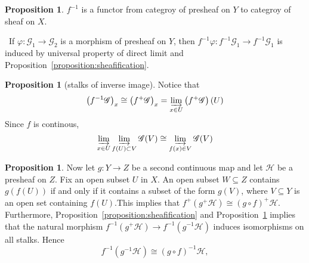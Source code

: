 \documentclass[12pt,a4paper]{book}
\newenvironment{prooff}{{\noindent\it\textcolor{cyan!40!black}{Proof}:}\,}{\par}
\theoremstyle{definition}
\newtheorem{prop}[defn]{Proposition}
\begin{document}
\begin{prop}
    $f^{-1}$ is a functor from categroy of presheaf on $Y$ to categroy of sheaf on $X$.
\end{prop}
\begin{prooff}
    If $\varphi:\mathscr{G}_1\rightarrow \mathscr{G}_2$ is a morphism of presheaf on $Y$, then $f^{-1}\varphi: f^{-1}\mathscr{G}_1\rightarrow  f^{-1}\mathscr{G}_1$ is induced by universal property of direct limit and Proposition~\ref{proposition:sheafification}.
\end{prooff}
\begin{prop}[stalks of inverse image]
    Notice that
    $$
        \left(f^{-1} \mathscr{G}\right)_x \cong\left(f^{+} \mathscr{G}\right)_x=\varinjlim_{x \in U}\left(f^{+}\mathscr{G}\right)(U)
    $$
    Since $f$ is continous,
    $$
        \varinjlim_{x\in U}\varinjlim_{f(U)\subset V}\mathscr{G}(V)  \cong \varinjlim_{f(x)\in V}\mathscr{G}(V)
    $$
    \label{stalks of direct image}
\end{prop}
\begin{prop}
    Now let $g: Y \rightarrow Z$ be a second continuous map and let $\mathscr{H}$ be a presheaf on $Z$. Fix an open subset $U$ in $X$. An open subset $W \subseteq Z$ contains $g(f(U))$ if and only if it contains a subset of the form $g(V)$, where $V \subseteq Y$ is an open set containing $f(U)$.This implies that $f^{+}\left(g^{+} \mathscr{H}\right)\cong (g \circ f)^{+} \mathscr{H}$.
    Furthermore, Proposition~\ref{proposition:sheafification} and Proposition~\ref{stalks of direct image} implies that the natural morphism $f^{-1}\left(g^{+} \mathscr{H}\right) \rightarrow f^{-1}\left(g^{-1} \mathscr{H}\right)$ induces isomorphisms on all stalks. Hence
    $$
        f^{-1}\left(g^{-1} \mathscr{H}\right) \cong(g \circ f)^{-1} \mathscr{H},
    $$
\end{prop}
\end{document}
